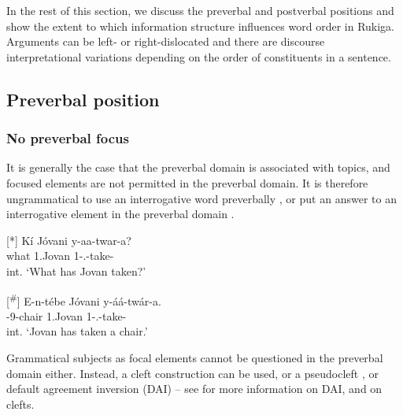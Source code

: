 \documentclass[output=paper]{langscibook}
\begin{document}
\z
\z


In the rest of this section, we discuss the preverbal and postverbal positions and show the extent to which information structure influences word order in Rukiga. Arguments can be left- or right-dislocated and there are discourse interpretational variations depending on the order of constituents in a sentence.

\subsection{Preverbal position}
\subsubsection{No preverbal focus}

It is generally the case that the preverbal domain is associated with topics, and focused elements are not permitted in the preverbal domain. It is therefore ungrammatical to use an interrogative word preverbally , or put an answer to an interrogative element in the preverbal domain . 

\ea
\label{bkm:Ref105427809}
\ea
[*]{
\label{bkm:Ref105427809:a}
\gll
Kí  Jóvani  y-aa-twar-a?\\
what  1.Jovan  1\SM{}-\N{}.\PST{}-{}take-\FV{}\\
\glt
int. ‘What has Jovan taken?’\\
}


\sn
[\textsuperscript{\#}]{
\gll
E-n-tébe  Jóvani  y-áá-twár-a.\\
\AUG{}-9-chair  1.Jovan  1\SM{}-\N{}.\PST{}-{}take-\FV{}\\
\glt
int. ‘Jovan has taken a chair.’\\
}

\z
\z


Grammatical subjects as focal elements cannot be questioned in the preverbal domain either. Instead, a cleft construction  can be used, or a pseudocleft , or default agreement inversion (DAI)  – see  for more information on DAI, and  on clefts.
\end{document}
